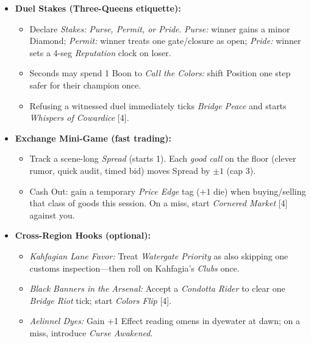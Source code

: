 \begin{itemize}
  \item \textbf{Duel Stakes (Three-Queens etiquette):}
  \begin{itemize}
    \item Declare \emph{Stakes:} \emph{Purse, Permit, or Pride}.  
      \emph{Purse:} winner gains a minor Diamond; \emph{Permit:} winner treats one gate/closure as open; \emph{Pride:} winner sets a 4-seg \emph{Reputation} clock on loser.
    \item Seconds may spend 1 Boon to \emph{Call the Colors:} shift Position one step safer for their champion once.
    \item Refusing a witnessed duel immediately ticks \emph{Bridge Peace} and starts \emph{Whispers of Cowardice} [4].
  \end{itemize}

  \item \textbf{Exchange Mini-Game (fast trading):}
  \begin{itemize}
    \item Track a scene-long \emph{Spread} (starts 1). Each \emph{good call} on the floor (clever rumor, quick audit, timed bid) moves Spread by \(\pm 1\) (cap 3).  
    \item Cash Out: gain a temporary \emph{Price Edge} tag (\(+1\) die) when buying/selling that class of goods this session. On a miss, start \emph{Cornered Market} [4] against you.
  \end{itemize}

  \item \textbf{Cross-Region Hooks (optional):}
  \begin{itemize}
    \item \emph{Kahfagian Lane Favor:} Treat \emph{Watergate Priority} as also skipping one customs inspection—then roll on Kahfagia’s \emph{Clubs} once.
    \item \emph{Black Banners in the Arsenal:} Accept a \emph{Condotta Rider} to clear one \emph{Bridge Riot} tick; start \emph{Colors Flip} [4].
    \item \emph{Aelinnel Dyes:} Gain +1 Effect reading omens in dyewater at dawn; on a miss, introduce \emph{Curse Awakened}.
  \end{itemize}


\end{itemize}
